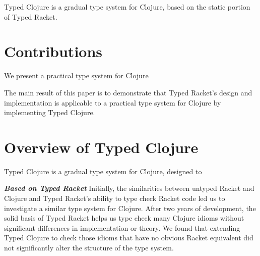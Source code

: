 \documentclass[preprint,10pt]{sigplanconf}
\newcommand\smallsection[1]{\bf \emph{#1}}
\begin{document}
Typed Clojure is a gradual type system for Clojure, based on the
static portion of Typed Racket.



\section{Contributions}

We present a practical type system for Clojure

The main result of this paper is to demonstrate that Typed Racket's design
and implementation is applicable to a practical type system for Clojure
by implementing Typed Clojure.

\section{Overview of Typed Clojure}

Typed Clojure is a gradual type system for Clojure, designed to 

{\smallsection {Based on Typed Racket}}
Initially, the similarities between untyped Racket and Clojure and Typed Racket's 
ability to type check Racket code led us to investigate a similar type system for Clojure.
After two years of development, the solid basis of Typed Racket 
helps us type check many Clojure idioms without significant differences
in implementation or theory. We found that extending Typed Clojure to check
those idioms that have no obvious Racket equivalent did not significantly alter the structure
of the type system.
\end{document}
